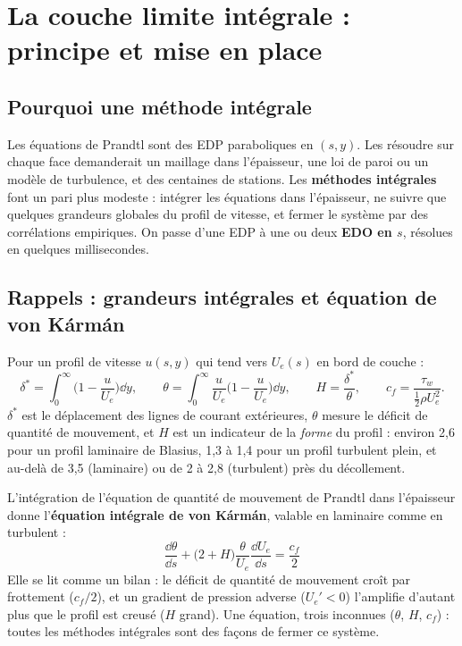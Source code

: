 \chapter{La couche limite intégrale : principe et mise en place}\label{ch:cl}

\section{Pourquoi une méthode intégrale}
Les équations de Prandtl sont des EDP paraboliques en $(s,y)$. Les résoudre sur chaque face demanderait un maillage dans l'épaisseur, une loi de paroi ou un modèle de turbulence, et des centaines de stations. Les \textbf{méthodes intégrales} font un pari plus modeste : intégrer les équations dans l'épaisseur, ne suivre que quelques grandeurs globales du profil de vitesse, et fermer le système par des corrélations empiriques. On passe d'une EDP à une ou deux \textbf{EDO en $s$}, résolues en quelques millisecondes.

\section{Rappels : grandeurs intégrales et équation de von Kármán}
Pour un profil de vitesse $u(s,y)$ qui tend vers $U_e(s)$ en bord de couche :
\[
\delta^*=\int_0^\infty\Big(1-\frac{u}{U_e}\Big)\dd y,\qquad
\theta=\int_0^\infty\frac{u}{U_e}\Big(1-\frac{u}{U_e}\Big)\dd y,\qquad
H=\frac{\delta^*}{\theta},\qquad c_f=\frac{\tau_w}{\tfrac12\rho U_e^2}.
\]
$\delta^*$ est le déplacement des lignes de courant extérieures, $\theta$ mesure le déficit de quantité de mouvement, et $H$ est un indicateur de la \emph{forme} du profil : environ 2,6 pour un profil laminaire de Blasius, 1,3 à 1,4 pour un profil turbulent plein, et au-delà de 3,5 (laminaire) ou de 2 à 2,8 (turbulent) près du décollement.

L'intégration de l'équation de quantité de mouvement de Prandtl dans l'épaisseur donne l'\textbf{équation intégrale de von Kármán}, valable en laminaire comme en turbulent :
\[
\boxed{\ \frac{\dd\theta}{\dd s}+\big(2+H\big)\frac{\theta}{U_e}\frac{\dd U_e}{\dd s}=\frac{c_f}{2}\ }
\]
Elle se lit comme un bilan : le déficit de quantité de mouvement croît par frottement ($c_f/2$), et un gradient de pression adverse ($U_e'<0$) l'amplifie d'autant plus que le profil est creusé ($H$ grand). Une équation, trois inconnues ($\theta$, $H$, $c_f$) : toutes les méthodes intégrales sont des façons de fermer ce système.

